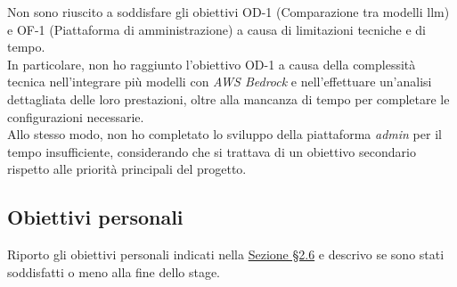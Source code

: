 \noindent Non sono riuscito a soddisfare gli obiettivi OD-1 (Comparazione tra modelli \gls{llm}) e OF-1 (Piattaforma di amministrazione) a causa di limitazioni tecniche e di tempo.\\

\noindent In particolare, non ho raggiunto l'obiettivo OD-1 a causa della complessità tecnica nell'integrare più modelli con \textit{AWS Bedrock} e nell'effettuare un'analisi dettagliata delle loro prestazioni, oltre alla mancanza di tempo per completare le configurazioni necessarie.\\
Allo stesso modo, non ho completato lo sviluppo della piattaforma \textit{admin} per il tempo insufficiente, considerando che si trattava di un obiettivo secondario rispetto alle priorità principali del progetto.

\subsection{Obiettivi personali}
\label{subsec:raggiungimento-obiettivi-personali}

Riporto gli obiettivi personali indicati nella \hyperref[sez:obiettivi-personali]{Sezione §2.6} e descrivo se sono stati soddisfatti o meno alla fine dello stage.\\

\renewcommand{\arraystretch}{1.5} %

